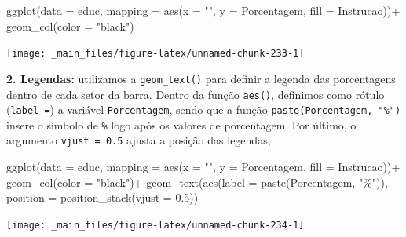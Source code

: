 \documentclass[
  brazilian,
]{book}
\newenvironment{Shaded}{\begin{snugshade}}{\end{snugshade}}
\newcommand{\AttributeTok}[1]{\textcolor[rgb]{0.77,0.63,0.00}{#1}}
\newcommand{\FloatTok}[1]{\textcolor[rgb]{0.00,0.00,0.81}{#1}}
\newcommand{\FunctionTok}[1]{\textcolor[rgb]{0.00,0.00,0.00}{#1}}
\newcommand{\NormalTok}[1]{#1}
\newcommand{\SpecialCharTok}[1]{\textcolor[rgb]{0.00,0.00,0.00}{#1}}
\newcommand{\StringTok}[1]{\textcolor[rgb]{0.31,0.60,0.02}{#1}}
\begin{document}
\begin{Shaded}
\begin{Highlighting}[]
\FunctionTok{ggplot}\NormalTok{(}\AttributeTok{data =}\NormalTok{ educ,}
       \AttributeTok{mapping =} \FunctionTok{aes}\NormalTok{(}\AttributeTok{x =} \StringTok{""}\NormalTok{,}
                     \AttributeTok{y =}\NormalTok{ Porcentagem,}
                     \AttributeTok{fill =}\NormalTok{ Instrucao))}\SpecialCharTok{+}
  \FunctionTok{geom\_col}\NormalTok{(}\AttributeTok{color =} \StringTok{"black"}\NormalTok{)}
\end{Highlighting}
\end{Shaded}

\begin{center}\texttt{[image: \_main\_files/figure-latex/unnamed-chunk-233-1]} \end{center}

\textbf{2. Legendas:} utilizamos a \texttt{geom\_text()} para definir a legenda das porcentagens dentro de cada setor da barra. Dentro da função \texttt{aes()}, definimos como rótulo (\texttt{label\ =}) a variável \texttt{Porcentagem}, sendo que a função \texttt{paste(Porcentagem,\ "\%")} insere o símbolo de \texttt{\%} logo após os valores de porcentagem. Por último, o argumento \texttt{vjust\ =\ 0.5} ajusta a posição das legendas;

\begin{Shaded}
\begin{Highlighting}[]
\FunctionTok{ggplot}\NormalTok{(}\AttributeTok{data =}\NormalTok{ educ,}
       \AttributeTok{mapping =} \FunctionTok{aes}\NormalTok{(}\AttributeTok{x =} \StringTok{""}\NormalTok{,}
                     \AttributeTok{y =}\NormalTok{ Porcentagem,}
                     \AttributeTok{fill =}\NormalTok{ Instrucao))}\SpecialCharTok{+}
  \FunctionTok{geom\_col}\NormalTok{(}\AttributeTok{color =} \StringTok{"black"}\NormalTok{)}\SpecialCharTok{+}
  \FunctionTok{geom\_text}\NormalTok{(}\FunctionTok{aes}\NormalTok{(}\AttributeTok{label =} \FunctionTok{paste}\NormalTok{(Porcentagem, }\StringTok{"\%"}\NormalTok{)),}
            \AttributeTok{position =} \FunctionTok{position\_stack}\NormalTok{(}\AttributeTok{vjust =} \FloatTok{0.5}\NormalTok{))}
\end{Highlighting}
\end{Shaded}

\begin{center}\texttt{[image: \_main\_files/figure-latex/unnamed-chunk-234-1]} \end{center}
\end{document}
